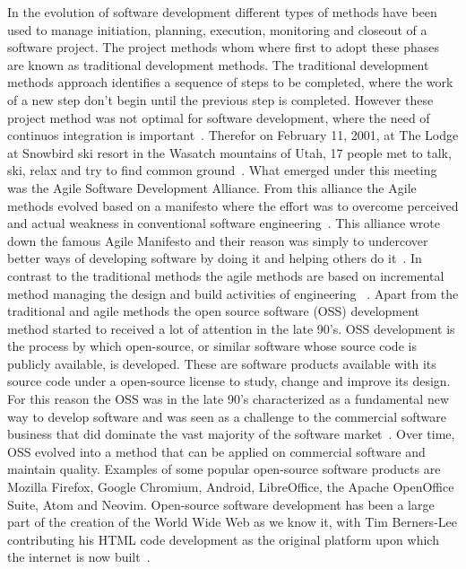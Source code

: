 \documentclass[a4paper,11pt]{article}
\begin{document}
{%
In the evolution of software development different types of methods have been used to manage initiation, planning, execution, monitoring and closeout of a software project. The project methods whom where first to adopt these phases are known as traditional development methods. The traditional development methods approach identifies a sequence of steps to be completed, where the work of a new step don't begin until the previous step is completed. However these project method was not optimal for software development, where the need of continuos integration is important~\cite{Jansson2015}. Therefor on February 11, 2001, at The Lodge at Snowbird ski resort in the Wasatch mountains of Utah, 17 people met to talk, ski, relax and try to find common ground~\cite{Fowler2001}. What emerged under this meeting was the Agile Software Development Alliance. From this alliance the Agile methods evolved based on a manifesto where the effort was to overcome perceived and actual weakness in conventional software engineering~\cite{Fowler2001}. This alliance wrote down the famous Agile Manifesto and their reason was simply to undercover better ways of developing software by doing it and helping others do it~\cite{Fowler2001}. In contrast to the traditional methods the agile methods are based on incremental method managing the design and build activities of engineering~\cite{Jansson2015} . Apart from the traditional and agile methods the open source software (OSS) development method started to received a lot of attention in the late 90's. OSS development is the process by which open-source, or similar software whose source code is publicly available, is developed. These are software products available with its source code under a open-source license to study, change and improve its design. For this reason the OSS was in the late 90's characterized as a fundamental new way to develop software and was seen as a challenge to the commercial software business that did dominate the vast majority of the software market~\cite{Mockus2002a}. Over time, OSS evolved into a method that can be applied on commercial software and maintain quality. Examples of some popular open-source software products are Mozilla Firefox, Google Chromium, Android, LibreOffice, the Apache OpenOffice Suite, Atom and Neovim. Open-source software development has been a large part of the creation of the World Wide Web as we know it, with Tim Berners-Lee contributing his HTML code development as the original platform upon which the internet is now built~\cite{timbernerslee}.

}
\end{document}
